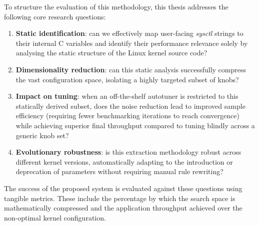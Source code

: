 To structure the evaluation of this methodology, this thesis addresses the following core research questions:
\begin{enumerate}
    \item \textbf{Static identification}: can we effectively map user-facing \textit{sysctl} strings to their internal C variables and identify their performance relevance solely by analysing the static structure of the Linux kernel source code?
    \item \textbf{Dimensionality reduction}: can this static analysis successfully compress the vast configuration space, isolating a highly targeted subset of knobs?
    \item \textbf{Impact on tuning}: when an off-the-shelf autotuner is restricted to this statically derived subset, does the noise reduction lead to improved sample efficiency (requiring fewer benchmarking iterations to reach convergence) while achieving superior final throughput compared to tuning blindly across a generic knob set?
    \item \textbf{Evolutionary robustness}: is this extraction methodology robust across different kernel versions, automatically adapting to the introduction or deprecation of parameters without requiring manual rule rewriting?
\end{enumerate}

The success of the proposed system is evaluated against these questions using tangible metrics.
These include the percentage by which the search space is mathematically compressed and the application throughput achieved over the non-optimal kernel configuration.

\newpage
